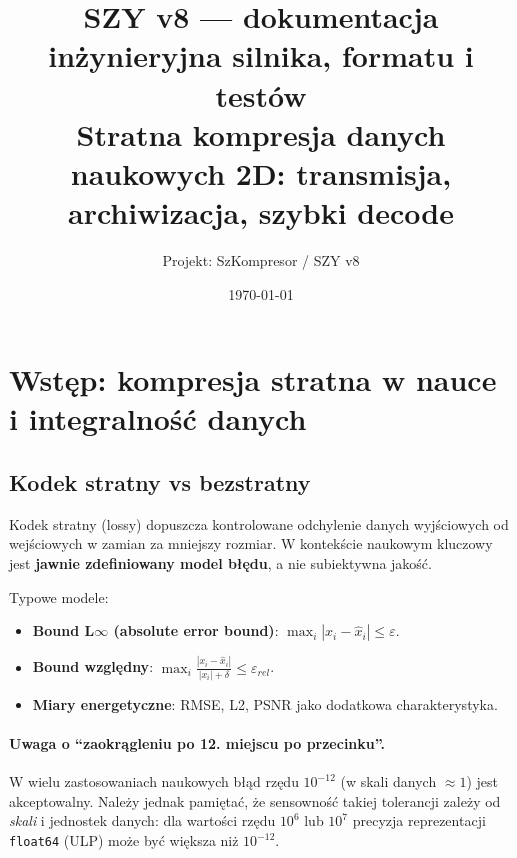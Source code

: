 \documentclass[11pt,a4paper]{article}
\title{SZY v8 --- dokumentacja inżynieryjna silnika, formatu i testów\\
Stratna kompresja danych naukowych 2D: transmisja, archiwizacja, szybki decode}
\author{Projekt: SzKompresor / SZY v8}
\date{\today}
\begin{document}
\maketitle

\tableofcontents
\newpage

\section{Wstęp: kompresja stratna w nauce i integralność danych}

\subsection{Kodek stratny vs bezstratny}
Kodek stratny (lossy) dopuszcza kontrolowane odchylenie danych wyjściowych od wejściowych w zamian za mniejszy rozmiar. W kontekście naukowym kluczowy jest \textbf{jawnie zdefiniowany model błędu}, a nie subiektywna jakość.

Typowe modele:
\begin{itemize}
  \item \textbf{Bound L$\infty$ (absolute error bound)}:
        $\max_i |x_i - \hat{x}_i| \le \varepsilon$.
  \item \textbf{Bound względny}:
        $\max_i \frac{|x_i - \hat{x}_i|}{|x_i|+\delta} \le \varepsilon_{rel}$.
  \item \textbf{Miary energetyczne}: RMSE, L2, PSNR jako dodatkowa charakterystyka.
\end{itemize}

\paragraph{Uwaga o ``zaokrągleniu po 12. miejscu po przecinku''.}
W wielu zastosowaniach naukowych błąd rzędu $10^{-12}$ (w skali danych $\approx 1$) jest akceptowalny. Należy jednak pamiętać, że sensowność takiej tolerancji zależy od \emph{skali} i jednostek danych: dla wartości rzędu $10^6$ lub $10^7$ precyzja reprezentacji \texttt{float64} (ULP) może być większa niż $10^{-12}$.
\end{document}
